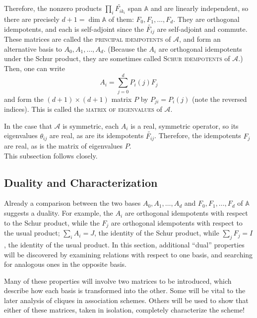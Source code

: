 \documentclass{report}
\newcommand{\AS}{\mathcal{A}}
\newcommand{\BMA}{\mathbb{A}}
\begin{document}
      Therefore, the nonzero products $\prod_i \tilde{F_{ik_i}}$ span $\BMA$
      and are linearly independent, so there are precisely $d+1 = \dim \BMA$ of
      them: $F_0, F_1, \ldots, F_d$.  They are orthogonal idempotents, and each
      is self-adjoint since the $\tilde{F_{ij}}$ are self-adjoint and commute.
      These matrices are called the \textsc{principal idempotents} of $\AS$, and
      form an alternative basis to $A_0, A_1, \ldots, A_d$.  (Because the $A_i$
      are orthogonal idempotents under the Schur product, they are sometimes
      called \textsc{Schur idempotents} of $\AS$.)
      Then, one can write
      $$
        A_i = \sum_{j = 0}^d P_i(j) F_j
      $$
      and form the $(d+1) \times (d+1)$ matrix $P$ by $P_{ji} = P_i(j)$
      (note the reversed indices).
      This is called the \textsc{matrix of eigenvalues} of $\AS$.
      \cite[Theorem 12.2.1]{godsil}

      In the case that $\AS$ is symmetric, each $A_i$ is a real, symmetric
      operator, so its eigenvalues $\theta_{ij}$ are real, as are its
      idempotents $\tilde{F_{ij}}$.  Therefore, the idempotents $F_j$ are real,
      as is the matrix of eigenvalues $P$.
      \\

      This subsection follows \cite[Section~12.2]{godsil} closely.

    \subsection{Duality and Characterization}\label{sec:AS:AS:duality}
      Already a comparison between the two bases $A_0, A_1, \ldots, A_d$
      and $F_0, F_1, \ldots, F_d$ of $\BMA$ suggests a duality.  For example,
      the $A_i$ are orthogonal idempotents with respect to the Schur product,
      while the $F_j$ are orthogonal idempotents with respect to the usual
      product; $\sum_i A_i = J$, the identity of the Schur product, while
      $\sum_j F_j = I$, the identity of the usual product.
      In this section, additional ``dual'' properties will be discovered by
      examining relations with respect to one basis, and searching for analogous
      ones in the opposite basis.

      Many of these properties will involve two matrices to be introduced, which
      describe how each basis is transformed into the other.  Some will be vital
      to the later analysis of cliques in association schemes.  Others will be
      used to show that either of these matrices, taken in isolation, completely
      characterize the scheme!
      \\
\end{document}
